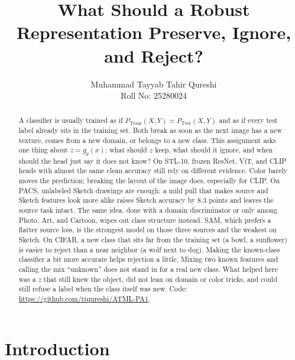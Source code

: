 \documentclass{article}
\title{What Should a Robust Representation Preserve, Ignore, and Reject?}
\author{Muhammad Tayyab Tahir Qureshi \\ Roll No: 25280024}
\begin{document}
\maketitle

\begin{abstract}
A classifier is usually trained as if $P_{\mathrm{Train}}(X,Y)=P_{\mathrm{Test}}(X,Y)$ and as if every test label already sits in the training set.
Both break as soon as the next image has a new texture, comes from a new domain, or belongs to a new class.
This assignment asks one thing about $z=g_\theta(x)$: what should $z$ keep, what should it ignore, and when should the head just say it does not know?
On STL-10, frozen ResNet, ViT, and CLIP heads with almost the same clean accuracy still rely on different evidence.
Color barely moves the prediction; breaking the layout of the image does, especially for CLIP.
On PACS, unlabeled Sketch drawings are enough: a mild pull that makes source and Sketch features look more alike raises Sketch accuracy by $8.3$ points and leaves the source task intact.
The same idea, done with a domain discriminator or only among Photo, Art, and Cartoon, wipes out class structure instead.
SAM, which prefers a flatter source loss, is the strongest model on those three sources and the weakest on Sketch.
On CIFAR, a new class that sits far from the training set (a bowl, a sunflower) is easier to reject than a near neighbor (a wolf next to dog).
Making the known-class classifier a bit more accurate helps rejection a little.
Mixing two known features and calling the mix ``unknown'' does not stand in for a real new class.
What helped here was a $z$ that still knew the object, did not lean on domain or color tricks, and could still refuse a label when the class itself was new.
Code: \url{https://github.com/ttqureshi/ATML-PA1}.
\end{abstract}

\section{Introduction}
\label{sec:intro}
\end{document}
